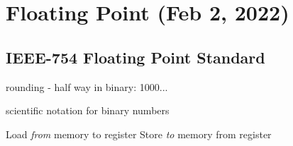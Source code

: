 \chapter{Floating Point (Feb 2, 2022)}

\section{IEEE-754 Floating Point Standard}
rounding - half way in binary: 1000...

scientific notation for binary numbers

Load \emph{from} memory to register
Store \emph{to} memory from register